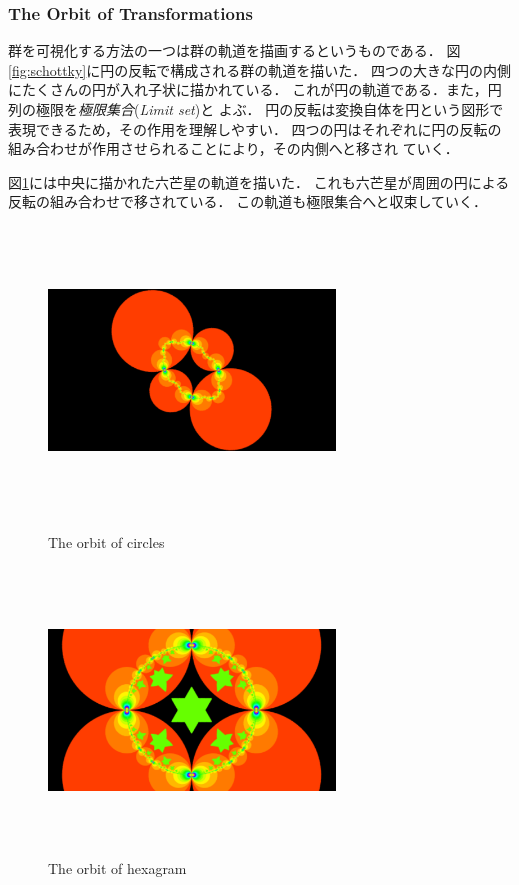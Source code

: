 \subsubsection{The Orbit of Transformations}

群を可視化する方法の一つは群の軌道を描画するというものである．
図\ref{fig:schottky}に円の反転で構成される群の軌道を描いた．
四つの大きな円の内側にたくさんの円が入れ子状に描かれている．
これが円の軌道である．また，円列の極限を\emph{極限集合}(\textit{Limit set})と
よぶ．
円の反転は変換自体を円という図形で表現できるため，その作用を理解しやすい．
四つの円はそれぞれに円の反転の組み合わせが作用させられることにより，その内側へと移され
ていく．

図\ref{fig:orbit}には中央に描かれた六芒星の軌道を描いた．
これも六芒星が周囲の円による反転の組み合わせで移されている．
この軌道も極限集合へと収束していく．
\begin{figure}[htbp]
 \begin{minipage}{0.49\hsize}
  \center
  \includegraphics[width=3in, height=3in, keepaspectratio]{../img/klein/schottkyCircles.pdf}
  \caption{The orbit of circles}
  \label{fig:schottky}
 \end{minipage}
 \begin{minipage}{0.49\hsize}
  \center
  \includegraphics[width=3in, height=3in, keepaspectratio]{../img/klein/starOrbit.pdf}
  \caption{The orbit of hexagram}
  \label{fig:orbit}
 \end{minipage}
\end{figure}

